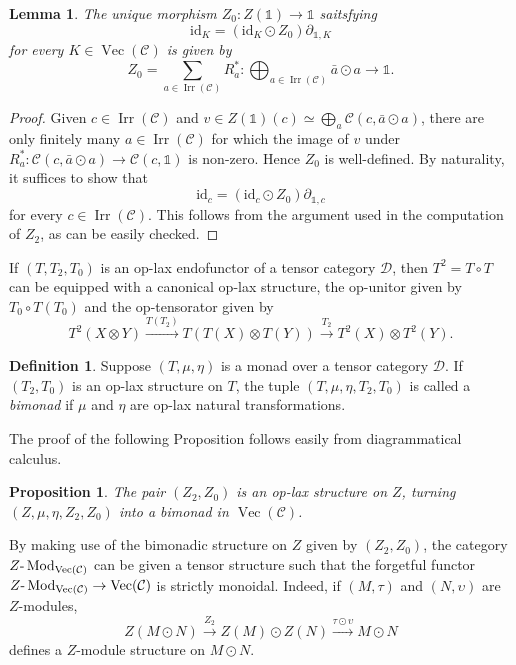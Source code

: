 \documentclass[a4paper,11pt,reqno]{amsart}
\numberwithin{equation}{section}
\newtheorem{lemma}[theorem]{Lemma}
\newtheorem{proposition}[theorem]{Proposition}
\theoremstyle{remark}
\theoremstyle{definition}
\newtheorem{definition}[theorem]{Definition}
\def\-{{\hbox{-}}}
\newcommand{\cC}{\mathcal C}
\newcommand{\cD}{\mathcal D}
\DeclareMathOperator{\Irr}{Irr}
\DeclareMathOperator{\Mod}{Mod}
\DeclareMathOperator{\Vect}{Vec}
\newcommand\un{{\mathds 1}}
\newcommand{\id}{\mathrm{id}}
\begin{document}
\begin{lemma}
	The unique morphism $Z_0: Z(\un) \to \un$ saitsfying
	\[
	\id_K = (\id_K \odot Z_0) \partial_{\un,K}
	\]
	for every $K \in \Vect(\cC)$ is given by
	\[
	Z_0 = \sum_{a \in \Irr(\cC)} R_a^* : \bigoplus_{a \in \Irr(\cC)} \bar{a} \odot a \to \un .
	\]
\end{lemma}
\begin{proof}
	Given $c \in \Irr(\cC)$ and $v \in Z(\un)(c) \simeq \bigoplus_a \cC(c, \bar{a} \odot a)$, there are only finitely many $a \in \Irr(\cC)$ for which the image of $v$ under $R_a^*: \cC(c,\bar{a} \odot a) \to \cC(c,\un)$ is non-zero. Hence $Z_0$ is well-defined. By naturality, it suffices to show that
	\[
	\id_c = (\id_c\odot Z_0) \partial_{\un,c}
	\]
	for every $c \in \Irr(\cC)$. This follows from the argument used in the computation of $Z_2$, as can be easily checked.
\end{proof}

If $(T,T_2,T_0)$ is an op-lax endofunctor of a  tensor category $\cD$, then $T^2 = T \circ T$ can be equipped with a canonical op-lax structure, the op-unitor given by $T_0 \circ T(T_0)$ and the op-tensorator given by
\[
T^2(X \otimes Y) \overset{T(T_2)}{\longrightarrow} T(T(X) \otimes T(Y)) \overset{T_2}{\longrightarrow} T^2(X) \otimes T^2(Y) .
\]

\begin{definition}\label{def:bimonad}
	Suppose $(T,\mu, \eta)$ is a monad over a tensor category $\cD$. If $(T_2,T_0)$ is an op-lax structure on $T$, the tuple $(T,\mu,\eta,T_2,T_0)$ is called a {\em bimonad} if $\mu$ and $\eta$ are op-lax natural transformations.
\end{definition}

The proof of the following Proposition follows easily from diagrammatical calculus.

\begin{proposition}
	The pair $(Z_2,Z_0)$ is an op-lax  structure on $Z$, turning $(Z,\mu,\eta,Z_2,Z_0)$ into a bimonad in $\Vect(\cC)$.
	\label{prop:Zisbimonad}
\end{proposition}

By making use of the bimonadic structure on $Z$ given by $(Z_2,Z_0)$, the category $Z \- \Mod_{\Vect(\cC)}$ can be given a tensor structure such that the forgetful functor $Z \- \Mod_{\Vect(\cC)} \to \Vect(\cC)$ is strictly monoidal. Indeed, if $(M,\tau)$ and $(N,\upsilon)$ are $Z$-modules,
\[
Z(M \odot N) \overset{Z_2}{\longrightarrow} Z(M) \odot Z(N) \overset{\tau \odot \upsilon}{\longrightarrow} M \odot N
\]
defines a $Z$-module structure on $M \odot N$.
\end{document}

